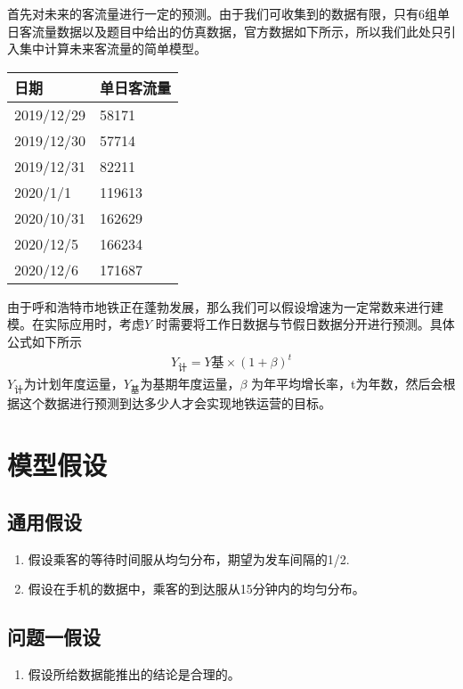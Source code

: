 \documentclass[12pt,a4paper]{mcmthesis}
\begin{document}
 {首先对未来的客流量进行一定的预测。由于我们可收集到的数据有限，只有6组单日客流量数据以及题目中给出的仿真数据，官方数据如下所示，所以我们此处只引入集中计算未来客流量的简单模型。}
\begin{table}
    \centering
    \begin{tabular}{|l|l|}
    \hline
        日期 & 单日客流量 \\ \hline
        2019/12/29 & 58171 \\ \hline
        2019/12/30 & 57714 \\ \hline
        2019/12/31 & 82211 \\ \hline
        2020/1/1 & 119613 \\ \hline
        2020/10/31 & 162629 \\ \hline
        2020/12/5 & 166234 \\ \hline
        2020/12/6 & 171687 \\ \hline
    \end{tabular}
\end{table}
    由于呼和浩特市地铁正在蓬勃发展，那么我们可以假设增速为一定常数来进行建模。在实际应用时，考虑$Y$ 时需要将工作日数据与节假日数据分开进行预测。具体公式如下所示
    \begin{equation}
        \begin{aligned}
            Y_{计}=Y{基} \times (1+\beta)^t
            \end{aligned}
    \end{equation}
    $Y_{计}$为计划年度运量，$Y_{基}$为基期年度运量，$\beta$ 为年平均增长率，t为年数，然后会根据这个数据进行预测到达多少人才会实现地铁运营的目标。




\section{模型假设}

\subsection{通用假设}
\begin{enumerate}
	\item 假设乘客的等待时间服从均匀分布，期望为发车间隔的1/2.
	\item 假设在手机的数据中，乘客的到达服从15分钟内的均匀分布。
\end{enumerate}
\subsection{问题一假设}
\begin{enumerate}
	\item 假设所给数据能推出的结论是合理的。
\end{enumerate}
\end{document}
